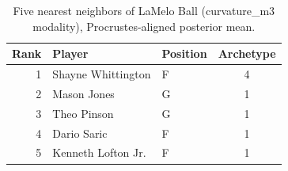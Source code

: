 \begin{table}[htbp]
  \centering\small
  \begin{tabular}{rllc}
    \toprule
    Rank & Player & Position & Archetype \\
    \midrule
    1 & Shayne Whittington & F & 4 \\
    2 & Mason Jones & G & 1 \\
    3 & Theo Pinson & G & 1 \\
    4 & Dario Saric & F & 1 \\
    5 & Kenneth Lofton Jr. & F & 1 \\
    \bottomrule
  \end{tabular}
  \caption{Five nearest neighbors of LaMelo Ball (curvature_m3 modality), Procrustes-aligned posterior mean.}
  \label{tab:LaMelo_Ball_neighbors_curvature_m3}
\end{table}


